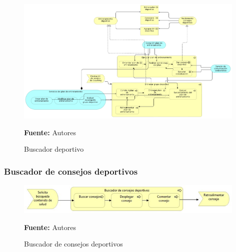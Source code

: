 \begin{figure}[!htb]
  \begin{center}
    \includegraphics[width=11cm]{./imagenes/business_process/entrenamientodeportivo.png}
    \caption{Buscador deportivo}
    \label{fig:BF_BuscadorDeportivo}
    \textbf{Fuente:}  Autores
  \end{center}
\end{figure}

\subsubsection{Buscador de consejos deportivos}

\begin{figure}[!htb]
  \begin{center}
    \includegraphics[width=11cm]{./imagenes/business_process/buscadorconsejosdeportivos.png}
    \caption{Buscador de consejos deportivos}
    \label{fig:BP_BuscadorConsejosDeportivos}
    \textbf{Fuente:}  Autores
  \end{center}
\end{figure}

